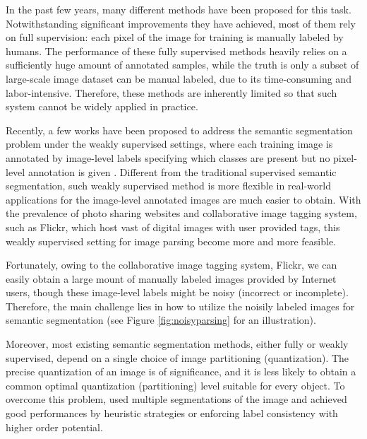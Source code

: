 In the past few years, many different methods \cite{csurka2011efficient,gonfaus2010harmony,ladicky2009associative,nowozin2010parameter,shotton2008semantic,shotton2006textonboost,singh2013nonparametric,verbeek2007scene,yang2007multiple,yao2012describing} have been proposed for this task. Notwithstanding significant improvements they have achieved, most of them rely on full supervision: each pixel of the image for training is manually labeled by humans. The performance of these fully supervised methods heavily relies on a sufficiently huge amount of annotated samples, while the truth is only a subset of large-scale image dataset can be manual labeled, due to its time-consuming and labor-intensive. Therefore, these methods are inherently limited so that such system cannot be widely applied in practice.

Recently, a few works have been proposed to address the semantic segmentation problem under the weakly supervised settings, where each training image is annotated by image-level labels specifying which classes are present but no pixel-level annotation is given \cite{verbeek2007region,vezhnevets2010towards,vezhnevets2011weakly,vezhnevets2012weakly,xu2014tell,zhang2013sparse,zhang2013probabilistic}. Different from the traditional supervised semantic segmentation, such weakly supervised method is more flexible in real-world applications for the image-level annotated images are much easier to obtain. With the prevalence of photo sharing websites and collaborative image tagging system, such as Flickr, which host vast of digital images with user provided tags, this weakly supervised setting for image parsing become more and more feasible.

 Fortunately, owing to the collaborative image tagging system, \eg Flickr, we can easily obtain a large mount of manually labeled images provided by Internet users, though these image-level labels might be noisy (incorrect or incomplete). Therefore, the main challenge lies in how to utilize the noisily labeled images for semantic segmentation (see Figure \ref{fig:noisyparsing} for an illustration).


 Moreover, most existing semantic segmentation methods, either fully or weakly supervised, depend on a single choice of image partitioning (quantization). The precise quantization of an image is of significance, and it is less likely to obtain a common optimal quantization (partitioning) level suitable for every object. To overcome this problem, \cite{hoiem2005geometric,kohli2009robust,ladicky2009associative,nowozin2010parameter,russell2006using} used multiple segmentations of the image and achieved good performances by heuristic strategies or enforcing label consistency with higher order potential.

